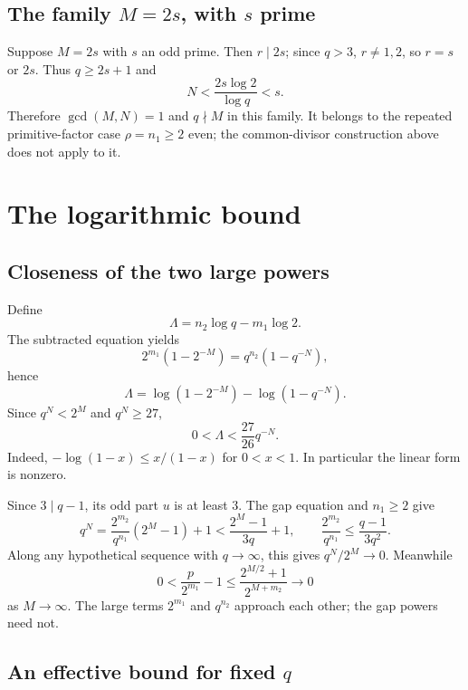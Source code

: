 \documentclass[11pt]{article}
\begin{document}
\subsection{\texorpdfstring{The family $M=2s$, with $s$ prime}{The family M=2s, with s prime}}

Suppose $M=2s$ with $s$ an odd prime. Then $r\mid2s$;
since $q>3$, $r\neq1,2$, so $r=s$ or $2s$.
Thus $q\geq2s+1$ and
\[
N<\frac{2s\log2}{\log q}<s.
\]
Therefore $\gcd(M,N)=1$ and $q\nmid M$ in this family.
It belongs to the repeated primitive-factor case $\rho=n_1\geq2$ even;
the common-divisor construction above does not apply to it.

\section{The logarithmic bound}
\label{sec:logarithms}

\subsection{Closeness of the two large powers}

Define
\[
\Lambda=n_2\log q-m_1\log2.
\]
The subtracted equation yields
\[
2^{m_1}(1-2^{-M})=q^{n_2}(1-q^{-N}),
\]
hence
\[
\Lambda=\log(1-2^{-M})-\log(1-q^{-N}).
\]
Since $q^N<2^M$ and $q^N\geq27$,
\begin{equation}\label{eq:lambda-upper}
\boxed{0<\Lambda<\frac{27}{26}q^{-N}.}
\end{equation}
Indeed, $-\log(1-x)\leq x/(1-x)$ for $0<x<1$.
In particular the linear form is nonzero.

Since $3\mid q-1$, its odd part $u$ is at least $3$. The gap equation
and $n_1\geq2$ give
\begin{equation}\label{eq:gap-ratio}
q^N=\frac{2^{m_2}}{q^{n_1}}(2^M-1)+1
 <\frac{2^M-1}{3q}+1,
\qquad \frac{2^{m_2}}{q^{n_1}}\leq\frac{q-1}{3q^2}.
\end{equation}
Along any hypothetical sequence with $q\to\infty$, this gives
$q^N/2^M\to0$. Meanwhile
\[
0<\frac{p}{2^{m_1}}-1
 \leq\frac{2^{M/2}+1}{2^{M+m_2}}\longrightarrow0
\]
as $M\to\infty$. The large terms $2^{m_1}$ and $q^{n_2}$ approach
each other; the gap powers need not.

\subsection{\texorpdfstring{An effective bound for fixed $q$}{An effective bound for fixed q}}
\end{document}
